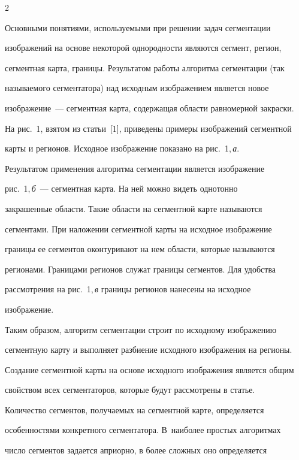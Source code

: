 \begin{multicols}{2}
  


  Основными понятиями, используемыми при решении задач сегментации 


изображений на основе некоторой однородности являются сегмент, регион, 


сегментная карта, границы. Результатом работы алгоритма сегментации (так 


называемого сегментатора) над исходным изображением является новое 


изображение~--- сегментная карта, содержащая области равномерной закраски. 


На рис.~1, взятом из статьи~[1], приведены примеры изображений сегментной 


карты и регионов. Исходное изображение показано на рис.~1,\,\textit{а}. 


Результатом применения алгоритма сегментации является изображение 


рис.~1,\,\textit{б}~--- сегментная карта. На ней можно видеть однотонно 


закрашенные области. Такие области на сегментной карте называются 


сегментами. При наложении сегментной карты на исходное изображение 


границы ее сегментов оконтуривают на нем области, которые называются 


регионами. Границами регионов служат границы сегментов. Для удобства 


рассмотрения на рис.~1,\,\textit{в} границы регионов нанесены на исходное 


изображение.








  Таким образом, алгоритм сегментации строит по исходному изображению 


сегментную карту и выполняет разбиение исходного изображения на регионы. 


Создание сегментной карты на основе исходного изображения является общим 


свойством всех сегментаторов, которые будут рассмотрены в статье.


  


  Количество сегментов, получаемых на сегментной карте, определяется 


особенностями конкретного сегментатора. В~наиболее простых алгоритмах 


число сегментов задается априорно, в более сложных оно определяется 



\end{multicols}
